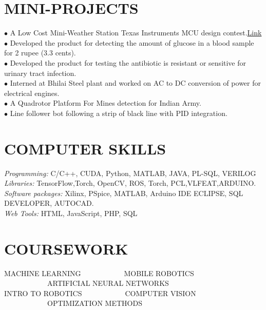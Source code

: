 \documentclass[a4paper,10pt]{article}
\begin{document}
 \section{MINI-PROJECTS} 
$\bullet$ A Low Cost Mini-Weather Station Texas Instruments MCU design contest.\href{http://www.youtube.com/watch?v=kyFDzlU89iE}{Link} \\
$\bullet$ Developed the product for detecting the amount of glucose in a blood sample for 2 rupee (3.3 cents). \\
$\bullet$  Developed the product for testing the antibiotic is resistant or sensitive for urinary tract infection.\\
$\bullet$ Interned at Bhilai Steel plant and worked on AC to DC conversion of power for electrical engines.\\
$\bullet$ A Quadrotor Platform For Mines detection for Indian Army.\\
$\bullet$ Line follower bot following a strip of black line with PID integration.\\
\section{COMPUTER SKILLS} 
{\sl Programming:}        C/C++, CUDA, Python, MATLAB, JAVA, PL-SQL, VERILOG\\
{\sl Libraries:        }      TensorFlow,Torch, OpenCV, ROS, Torch, PCL,VLFEAT,ARDUINO.\\
{\sl Software packages: }Xilinx, PSpice, MATLAB, Arduino IDE
                       ECLIPSE, SQL DEVELOPER, AUTOCAD.\\
{\sl Web Tools:          }  HTML, JavaScript, PHP, SQL \\
 
\section{COURSEWORK}
MACHINE LEARNING\ \ \ \ \ \ \ \ \ \ \ \  MOBILE ROBOTICS \ \ \ \ \ \ \  \ \ \ \ \ ARTIFICIAL NEURAL NETWORKS \\  INTRO TO ROBOTICS\ \ \ \ \ \ \ \ \ \ \ \ COMPUTER VISION \ \ \ \  \ \ \ \ \ \ \ \   OPTIMIZATION METHODS\\
\end{document}
